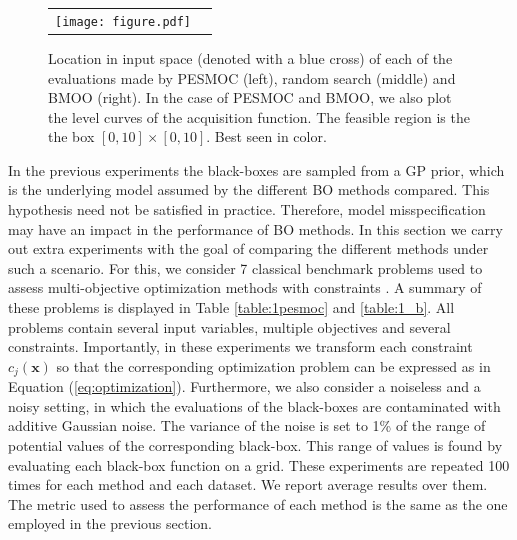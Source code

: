 \begin{figure}[htb]
        \begin{tabular}{cc}
        \texttt{[image: figure.pdf]}
        \end{tabular}
        \caption{{\small Location in input space (denoted with a blue cross) of each of the evaluations made by PESMOC
                (left), random search (middle) and BMOO (right). In the case of PESMOC and BMOO, we also plot the level
                curves of the acquisition function. The feasible region is the the box $[0,10] \times [0,10]$. Best seen in color. }}
        \label{fig:evaluations}
\end{figure}

In the previous experiments the black-boxes are sampled from a GP prior, which is the underlying model assumed by the different
BO methods compared. This hypothesis need not be satisfied in practice. Therefore, model misspecification may have an impact in
the performance of BO methods. In this section we carry out extra experiments with the goal of comparing the different methods
under such a scenario. For this, we consider 7 classical benchmark problems used to assess multi-objective optimization methods
with constraints \citep{chafekar2003constrained,deb2002fast}. A summary of these problems is displayed in Table \ref{table:1pesmoc} and \ref{table:1_b}.
All problems contain several input variables, multiple objectives and several constraints. Importantly, in these experiments
we transform each constraint $c_j(\mathbf{x})$ so that the corresponding optimization problem can be expressed as
in Equation (\ref{eq:optimization}). Furthermore, we also consider a noiseless and a noisy setting, in which the evaluations of the
black-boxes are contaminated with additive Gaussian noise. The variance of the noise is set to 1\% of the range of potential
values of the corresponding black-box. This range of values is found by evaluating each black-box function on a grid.
These experiments are repeated 100 times for each method and each dataset. We report average results over them. The metric used
to assess the performance of each method is the same as the one employed in the previous section.

